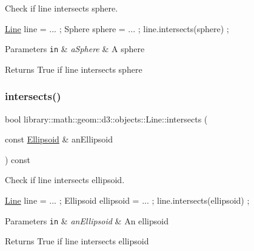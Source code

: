 Check if line intersects sphere. 


\begin{DoxyCode}
\hyperlink{classlibrary_1_1math_1_1geom_1_1d3_1_1objects_1_1_line_a762e529453ff9ffa9233fd73737f4692}{Line} line = ... ;
Sphere sphere = ... ;
line.intersects(sphere) ;
\end{DoxyCode}



\begin{DoxyParams}[1]{Parameters}
\mbox{\tt in}  & {\em a\+Sphere} & A sphere \\
\hline
\end{DoxyParams}
\begin{DoxyReturn}{Returns}
True if line intersects sphere 
\end{DoxyReturn}
\mbox{\label{classlibrary_1_1math_1_1geom_1_1d3_1_1objects_1_1_line_a2cc1edf1b60745c518fbf19f2ab0771c}} 
\subsubsection{\texorpdfstring{intersects()}{intersects()}\hspace{0.1cm}{\footnotesize\ttfamily [3/3]}}
{\footnotesize\ttfamily bool library\+::math\+::geom\+::d3\+::objects\+::\+Line\+::intersects (\begin{DoxyParamCaption}\item[{const \hyperlink{classlibrary_1_1math_1_1geom_1_1d3_1_1objects_1_1_ellipsoid}{Ellipsoid} \&}]{an\+Ellipsoid }\end{DoxyParamCaption}) const}



Check if line intersects ellipsoid. 


\begin{DoxyCode}
\hyperlink{classlibrary_1_1math_1_1geom_1_1d3_1_1objects_1_1_line_a762e529453ff9ffa9233fd73737f4692}{Line} line = ... ;
Ellipsoid ellipsoid = ... ;
line.intersects(ellipsoid) ;
\end{DoxyCode}



\begin{DoxyParams}[1]{Parameters}
\mbox{\tt in}  & {\em an\+Ellipsoid} & An ellipsoid \\
\hline
\end{DoxyParams}
\begin{DoxyReturn}{Returns}
True if line intersects ellipsoid 
\end{DoxyReturn}
\mbox{\label{classlibrary_1_1math_1_1geom_1_1d3_1_1objects_1_1_line_ab7b509259a32ac21c83bb14fcc7f83f3}} 
